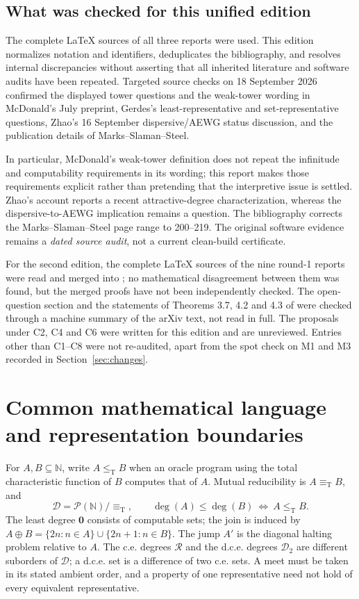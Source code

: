\documentclass[11pt,a4paper]{article}
\newcommand{\N}{\mathbb N}
\newcommand{\D}{\mathcal D}
\newcommand{\R}{\mathcal R}
\newcommand{\leT}{\leq_{\mathrm T}}
\newcommand{\eqT}{\equiv_{\mathrm T}}
\newcommand{\zero}{\mathbf0}
\theoremstyle{definition}\newtheorem{definition}[theorem]{Definition}
\theoremstyle{remark}\newtheorem{remark}[theorem]{Remark}
\begin{document}
\subsection{What was checked for this unified edition}
The complete LaTeX sources of all three reports were used. This edition normalizes notation and identifiers, deduplicates the bibliography, and resolves internal discrepancies without asserting that all inherited literature and software audits have been repeated. Targeted source checks on 18 September 2026 confirmed the displayed tower questions and the weak-tower wording in McDonald's July preprint, Gerdes's least-representative and set-representative questions, Zhao's 16 September dispersive/AEWG status discussion, and the publication details of Marks--Slaman--Steel.\cite{McDonald,Gerdes,Zhao,MSS}

In particular, McDonald's weak-tower definition does not repeat the infinitude and computability requirements in its wording; this report makes those requirements explicit rather than pretending that the interpretive issue is settled. Zhao's account reports a recent attractive-degree characterization, whereas the dispersive-to-AEWG implication remains a question. The bibliography corrects the Marks--Slaman--Steel page range to 200--219. The original software evidence remains a \emph{dated source audit}, not a current clean-build certificate.\cite{McDonald,Zhao,MSS,ReportA,ReportB,ReportC}

For the second edition, the complete LaTeX sources of the nine round-1 reports were read and merged into \cite{Synthesis}; no mathematical disagreement between them was found, but the merged proofs have not been independently checked. The open-question section and the statements of Theorems 3.7, 4.2 and 4.3 of \cite{HJKS} were checked through a machine summary of the arXiv text, not read in full. The proposals under C2, C4 and C6 were written for this edition and are unreviewed. Entries other than C1--C8 were not re-audited, apart from the spot check on M1 and M3 recorded in Section~\ref{sec:changes}.


\section{Common mathematical language and representation boundaries}
\label{sec:language}
For $A,B\subseteq\N$, write $A\leT B$ when an oracle program using the total characteristic function of $B$ computes that of $A$. Mutual reducibility is $A\eqT B$, and
\[
 \D=\mathcal P(\N)/{\equiv_{\mathrm T}},\qquad
 \deg(A)\leq\deg(B)\ \Longleftrightarrow\ A\leT B.
\]
The least degree $\zero$ consists of computable sets; the join is induced by
$A\oplus B=\{2n:n\in A\}\cup\{2n+1:n\in B\}$. The jump $A'$ is the diagonal halting problem relative to $A$. The c.e. degrees $\R$ and the d.c.e. degrees $\D_2$ are different suborders of $\D$; a d.c.e. set is a difference of two c.e. sets. A meet must be taken in its stated ambient order, and a property of one representative need not hold of every equivalent representative.
\end{document}
